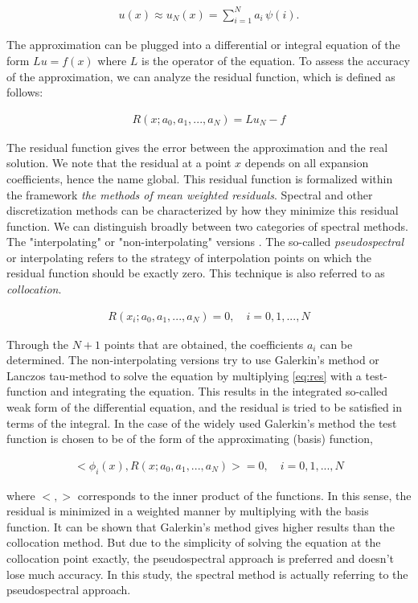 \begin{align}
u(x) \approx u_N(x) = \sum_{i=1}^{N} a_i \, \psi(i). 
\label{eq:approx}
\end{align}

The approximation can be plugged into a differential or integral equation of
the form $Lu=f(x)$ where $L$ is the operator of the equation. To assess the
accuracy of the approximation, we can analyze the residual function, which is
defined as follows:

\begin{align}
R(x; a_0, a_1, . . . , a_N) = Lu_N - f \label{eq:res}
\end{align}

The residual function gives the error between the approximation and the real
solution. We note that the residual at a point $x$ depends on all expansion
coefficients, hence the name global. This residual function is formalized
within the framework \emph{the methods of mean weighted residuals}. Spectral
and other discretization methods can be characterized by how they minimize this
residual function. We can distinguish broadly between two categories of
spectral methods. The "interpolating" or "non-interpolating" versions
\citep{boyd2001}. The so-called \emph{pseudospectral} or interpolating refers
to the strategy of interpolation points on which the residual function should
be exactly zero. This technique is also referred to as \emph{collocation}.

\begin{align}
R(x_i; a_0, a_1, . . . , a_N) = 0, \quad i=0,1,...,N 
\label{eq:res_collo}
\end{align}

Through the $N+1$ points that are obtained, the coefficients $a_i$ can be
determined. The non-interpolating versions try to use Galerkin's method or
Lanczos tau-method to solve the equation by multiplying \eqref{eq:res} with a
test-function and integrating the equation. This results in the integrated
so-called weak form of the differential equation, and the residual is tried to
be satisfied in terms of the integral. In the case of the widely used
Galerkin's method the test function is chosen to be of the form of the
approximating (basis) function,

\begin{align}
<\phi_i(x), R(x; a_0, a_1, . . . , a_N)> = 0, \quad i=0,1,...,N 
\label{eq:res_galerkin}
\end{align}

where $<,>$ corresponds to the inner product of the functions. In this sense,
the residual is minimized in a weighted manner by multiplying with the basis
function. It can be shown that Galerkin's method gives higher results than the
collocation method. But due to the simplicity of solving the equation at the
collocation point exactly, the pseudospectral approach is preferred and doesn't
lose much accuracy. In this study, the spectral method is
actually referring to the pseudospectral approach. \\

